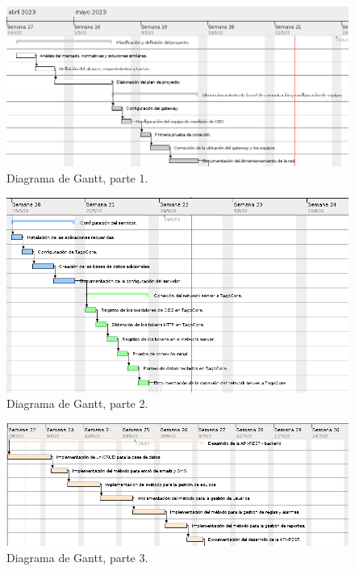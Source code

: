 \documentclass[
11pt, %
]{charter}
\begin{document}
\begin{figure}[htpb]
\centering 
\includegraphics[height=.3\textheight]{./Figuras/Gantt1.png}
\caption{Diagrama de Gantt, parte 1.}
\label{fig:diagGantt1}
\end{figure}

\begin{figure}[htpb]
\centering 
\includegraphics[height=.37\textheight]{./Figuras/Gantt2.png}
\caption{Diagrama de Gantt, parte 2.}
\label{fig:diagGantt2}
\end{figure}

\begin{figure}[htpb]
\centering 
\includegraphics[height=.23\textheight]{./Figuras/Gantt3.png}
\caption{Diagrama de Gantt, parte 3.}
\label{fig:diagGantt3}
\end{figure}
\end{document}
